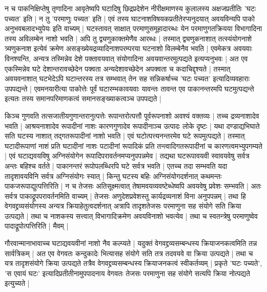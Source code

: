 न च पाकनिक्षिप्तेषु तृणादिना आवृतेष्वपि घटादिषु छिद्रप्रदेशेन नीरीक्षमाणस्य कुलालस्य अक्षजप्रतीतिः 'घटः पच्यत' इति | न तु 'परमाणुः पच्यत' इति | एवं तस्य घाटनाशविषयकप्रतीतेरप्यनुदयात् अवयविन्यपि पाको अनुभवबलादभ्युपेयः इति वाच्यम् | घटस्तावत् साक्षात् परमाणुसमूहादारब्धः येन परमाणुगतक्रियया विभागादिना तस्य अविलम्बेन नाशो भवति | अपि तु द्व्यणुकाक्तमेणैव आरब्धः | तस्मात् द्व्यणुकनाशात् तत्स्यंयोगनाशे त्र्यणुकनाश इत्येवं क्रमेण असङ्ख्येयद्रव्यादिनाशपरम्परया घटनाशो विलम्बेनैव भवति | एवमेकत्र अवयवाः विनश्यन्ति, अन्यत्र तस्मिन्नेव देशे पक्तावयवात् संयोगादिना अवयवान्तरमुत्पद्यते इत्यप्यनुभवः | अत एव एकस्मिन्नेव घटे देशान्तरावच्छेदेन पक्वता अन्यदेशावच्छेदेन अपक्वता च कदाचिद्दृश्यते | तस्मात् अवयवनाशात् घटभेदेऽपि घटान्तरस्य तत्र सम्भवात् तेन सह सन्निकर्षाच्च 'घटः पच्यत' इत्यादिव्यवहाराः उपपद्यन्ते | एवमनयारीत्या पाकोत्तेः पूर्वं घटारम्भकावयवाः यावन्तः तावन्त एव पाकानन्तरमपि घटमुत्पद्यन्ते इत्यतः तस्य समानपरिमाणकत्वं समानसङ्ख्याकत्वञ्च उपपद्यते |

किञ्च गुणवति तत्सजातीयगुणान्तरानुत्पत्तेः रूपान्तरोत्पत्तौ पूर्वरूपनाशो अवश्यं वक्तव्यः | तच्च द्रव्यनाशादेव भवति | आश्रयनाशादेव रूपादीनां नाशः कारणगुणादेव रूपादीनाञ्च उत्पादः लोके दृष्टः | यथा दण्डाद्यभिघाते सति घटस्य नाशात् तद्गतरूपादीनां नाशो भवति | एवं घटोत्पत्त्यनन्तरमेव घटे रूपमुत्पद्यते | तस्मात् घटादीरूपाणां नाशं प्रति घटादीनां नाशः पटादीनां रूपादिकं प्रति तन्त्वादिगतरूपादीनां च कारणत्वमभ्युपगम्यते | एवं घटाद्यवयविषु अग्निसंयोगेन रूपादिपरावर्तनमप्यनुपपन्नमेव | तद्यथा घटरूपावयवी स्वावयवेषु सर्वत्र अन्तः बहिश्च वर्तते | पाकानन्तरं रूपोपलब्धिरपि घटे सर्वत्र भवति | एतच्च तदा सम्भवति यदा तादृशावयविनि सर्वत्र अग्निसंयोगः स्यात् | किन्तु घटस्य बहिः अग्निसंयोगदर्शनात् कथमन्तः पाकजरूपाद्युत्पत्तिरिति | न च तेजसः अतिसूक्ष्मत्वात् तेषामवयव्यवष्टेब्धेष्वपि अवयवेषु प्रवेशः सम्भवति | अतः सर्वत्र पाकाद्रूपपरावर्तनमिति वाच्यम् | तेजसः अणुदेशप्रवेशस्तु कार्यद्रव्यनाशं विना अनुपपन्नम् | तथा हि वेगवद्द्रव्यसंयोगस्य अन्यत्र क्रियाहेतुत्वदर्शनात् अत्रापि तादृशतेजसः परमाणुना सह संयोगे सति क्रिया उत्पद्यते | तथा च नाशकस्य सत्त्वात् विभागादिक्रमेण अवयविनाशो भवत्येव | तथा च स्वतन्त्रेषु परमाणुष्वेव पादाद्रूपोत्पत्तिरिति | मैवम् |



गौरवान्मानाभावाच्च घटाद्यवयवीनां नाशो नैव कल्प्यते | यदुक्तं वेगवद्द्रव्यसम्बन्धस्य क्रियाजनकत्वमिति तन्न सार्वत्रिकम् | अत एव वेगवतः कन्दुकादेः भित्यासह संयोगे सति तत्र तदवयवे वा क्रिया उत्पद्यते | तथा च यत्र तादृशसंयोगे क्रिया उत्पद्यते तत्रैव  वेगवद्द्रव्यसम्बन्धस्य क्रियाजनकत्वं स्वीकर्तव्यम् | प्रकृते 'घटः पच्यते', 'स एवायं घटः' इत्यादिप्रतीतीनामुपपादनाय वेगवतः तेजसः परमाणुना सह संयोगे सत्यपि क्रिया नोत्पद्यते इत्युच्यते | 

